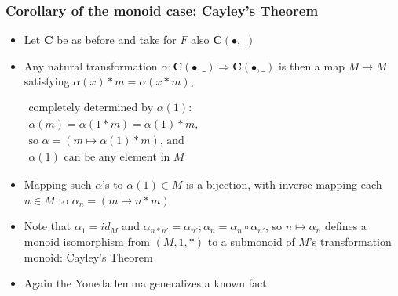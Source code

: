 \documentclass[handout]{beamer}
\newcommand{\To}{\Rightarrow}
\newcommand{\bfsf}[1]{{\boldsymbol{#1}}}
\newcommand{\CC}{\bfsf{C}}
\begin{document}
\frame
  {   
    \frametitle{Corollary of the monoid case: Cayley's Theorem}\label{Yon:MonCayley}

 \begin{itemize}[<+->]
\item Let $\CC$ be as before and take for $F$ also $\CC(\bullet,\_)$
\item Any natural transformation $\alpha: \CC(\bullet,\_)\To \CC(\bullet,\_)$ is
then a map $M\to M$ satisfying $\alpha(x)*m = \alpha(x*m)$,
$\begin{array}{l}%
\text{completely determined by $\alpha(1)$:}\\
\text{$\alpha(m) = \alpha(1*m)   = \alpha(1)*m$,}\\
\text{so $\alpha = (m\mapsto \alpha(1)*m)$, and}\\ %
\text{$\alpha(1)$ can be any element in $M$}
\end{array}$
\item Mapping such $\alpha$'s to $\alpha(1)\in M$ is a bijection, with inverse
mapping each $n\in M$ to $\alpha_n = (m\mapsto n*m)$ %
\item Note that $\alpha_1 = id_M$ and 
$\alpha_{n*n'} = \alpha_{n'};\alpha_n= \alpha_n\circ\alpha_{n'}$, so
$n\mapsto\alpha_n$ defines a monoid isomorphism  from $(M,1,*)$
to a submonoid of $M$'s transformation monoid: Cayley's Theorem
\item Again  the Yoneda lemma generalizes a known fact
 \end{itemize}

}
\end{document}
